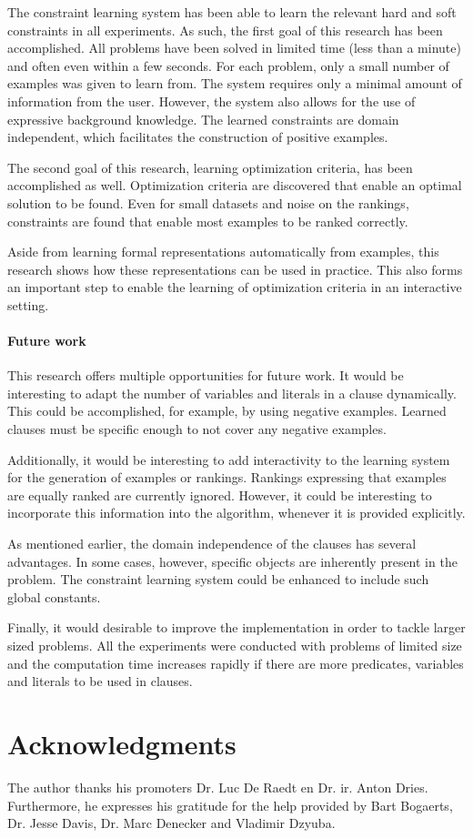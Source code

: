 \documentclass{llncs}
\begin{document}
The constraint learning system has been able to learn the relevant hard and soft constraints in all experiments.
As such, the first goal of this research has been accomplished.
All problems have been solved in limited time (less than a minute) and often even within a few seconds.
For each problem, only a small number of examples was given to learn from.
The system requires only a minimal amount of information from the user.
However, the system also allows for the use of expressive background knowledge.
The learned constraints are domain independent, which facilitates the construction of positive examples.

The second goal of this research, learning optimization criteria, has been accomplished as well.
Optimization criteria are discovered that enable an optimal solution to be found.
Even for small datasets and noise on the rankings, constraints are found that enable most examples to be ranked correctly.

Aside from learning formal representations automatically from examples, this research shows how these representations can be used in practice.
This also forms an important step to enable the learning of optimization criteria in an interactive setting.

\paragraph{Future work}
This research offers multiple opportunities for future work.
It would be interesting to adapt the number of variables and literals in a clause dynamically.
This could be accomplished, for example, by using negative examples.
Learned clauses must be specific enough to not cover any negative examples. 

Additionally, it would be interesting to add interactivity to the learning system for the generation of examples or rankings.
Rankings expressing that examples are equally ranked are currently ignored.
However, it could be interesting to incorporate this information into the algorithm, whenever it is provided explicitly.

As mentioned earlier, the domain independence of the clauses has several advantages.
In some cases, however, specific objects are inherently present in the problem.
The constraint learning system could be enhanced to include such global constants.

Finally, it would desirable to improve the implementation in order to tackle larger sized problems.
All the experiments were conducted with problems of limited size and the computation time increases rapidly if there are more predicates, variables and literals to be used in clauses.

\section*{Acknowledgments}
The author thanks his promoters Dr. Luc De Raedt en Dr. ir. Anton Dries.
Furthermore, he expresses his gratitude for the help provided by Bart Bogaerts, Dr. Jesse Davis, Dr. Marc Denecker and Vladimir Dzyuba.


%
%


\end{document}
